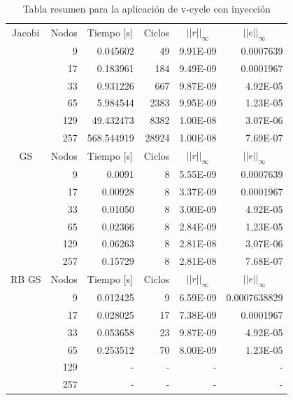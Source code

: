 \documentclass[letter,10pt]{article}
\begin{document}
\begin{table}[H]
\centering
\caption{Tabla resumen para la aplicación de v-cycle con inyección}
\begin{tabular}[t]{|l|r|r|r|r|r|}
\hline
\multicolumn{ 1}{|c|}{Jacobi} & \multicolumn{1}{l|}{Nodos} & \multicolumn{1}{l|}{Tiempo [s]}& \multicolumn{1}{l|}{Ciclos} & \multicolumn{1}{c|}{$||r||_{\infty}$} & \multicolumn{1}{c|}{$||e||_{\infty}$} \\ \cline{ 2- 6}
\multicolumn{ 1}{|l|}{} &9 & 0.045602& 49 & 9.91E-09 & 0.0007639 \\ \cline{ 2- 6}
\multicolumn{ 1}{|l|}{} & 17 & 0.183961 & 184 &9.49E-09 & 0.0001967 \\ \cline{ 2- 6}
\multicolumn{ 1}{|l|}{} & 33 & 0.931226 & 667 &9.87E-09 & 4.92E-05 \\ \cline{ 2- 6}
\multicolumn{ 1}{|l|}{} & 65 & 5.984544 & 2383 &9.95E-09 & 1.23E-05 \\ \cline{ 2- 6}
\multicolumn{ 1}{|l|}{} & 129 & 49.432473 & 8382 &1.00E-08 & 3.07E-06 \\ \cline{ 2- 6}
\multicolumn{ 1}{|l|}{} & 257 & 568.544919 & 28924 & 1.00E-08 &7.69E-07 \\ \hline

\multicolumn{ 1}{|c|}{GS} & \multicolumn{1}{l|}{Nodos} & \multicolumn{1}{l|}{Tiempo [s]}& \multicolumn{1}{l|}{Ciclos} & \multicolumn{1}{c|}{$||r||_{\infty}$} & \multicolumn{1}{c|}{$||e||_{\infty}$} \\ \cline{ 2- 6}
\multicolumn{ 1}{|l|}{} &9 & 0.0091& 8 & 5.55E-09 & 0.0007639 \\ \cline{ 2- 6}
\multicolumn{ 1}{|l|}{} & 17 & 0.00928 & 8 &3.37E-09 & 0.0001967 \\ \cline{ 2- 6}
\multicolumn{ 1}{|l|}{} & 33 & 0.01050 & 8 &3.00E-09 & 4.92E-05 \\ \cline{ 2- 6}
\multicolumn{ 1}{|l|}{} & 65 & 0.02366& 8 & 2.84E-09 & 1,23E-05 \\ \cline{ 2- 6}
\multicolumn{ 1}{|l|}{} & 129 & 0.06263& 8 & 2.81E-08 & 3,07E-06 \\ \cline{ 2- 6}
\multicolumn{ 1}{|l|}{} & 257 & 0.15729& 8 & 2.81E-08 & 7.68E-07 \\ \hline

\multicolumn{ 1}{|c|}{RB GS} & \multicolumn{1}{l|}{Nodos} & \multicolumn{1}{l|}{Tiempo [s]}& \multicolumn{1}{l|}{Ciclos} & \multicolumn{1}{c|}{$||r||_{\infty}$} & \multicolumn{1}{c|}{$||e||_{\infty}$} \\ \cline{ 2- 6}
\multicolumn{ 1}{|l|}{} &9 & 0.012425& 9 & 6.59E-09 & 0.0007638829 \\ \cline{ 2- 6}
\multicolumn{ 1}{|l|}{} & 17 & 0.028025 & 17 &7.38E-09 & 0.0001967 \\ \cline{ 2- 6}
\multicolumn{ 1}{|l|}{} & 33 & 0.053658 & 23 &9.87E-09 & 4.92E-05 \\ \cline{ 2- 6}
\multicolumn{ 1}{|l|}{} & 65 & 0.253512 & 70 & 8.00E-09 & 1.23E-05 \\ \cline{ 2- 6}
\multicolumn{ 1}{|l|}{} & 129 & - & - & - & - \\ \cline{ 2- 6}
\multicolumn{ 1}{|l|}{} & 257 & - & - & - & - \\ \hline
\end{tabular}
\label{resumenvcin}
\end{table}
\end{document}

